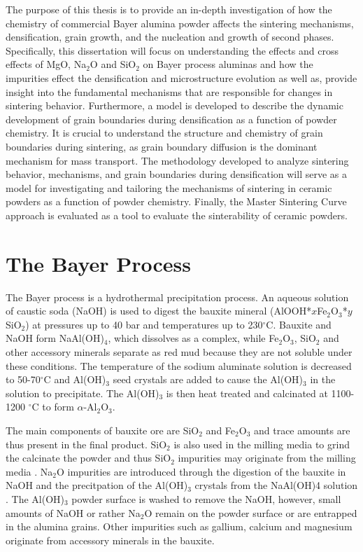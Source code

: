 The purpose of this thesis is to provide an in-depth investigation of how the chemistry of commercial Bayer alumina powder affects the sintering mechanisms, densification, grain growth, and the nucleation and growth of second phases. Specifically, this dissertation will focus on understanding the effects and cross effects of MgO, Na$_{2}$O and SiO$_{2}$ on Bayer process aluminas and how the impurities effect the densification and microstructure evolution as well as, provide insight into the fundamental mechanisms that are responsible for changes in sintering behavior. Furthermore, a model is developed to describe the dynamic development of grain boundaries during densification as a function of powder chemistry. It is crucial to understand the structure and chemistry of grain boundaries during sintering, as grain boundary diffusion is the dominant mechanism for mass transport. The methodology developed to analyze sintering behavior, mechanisms, and grain boundaries during densification will serve as a model for investigating and tailoring the mechanisms of sintering in ceramic powders as a function of powder chemistry. Finally, the Master Sintering Curve approach is evaluated as a tool to evaluate the sinterability of ceramic powders.


\section{The Bayer Process}

The Bayer process is a hydrothermal precipitation process. An aqueous solution of caustic soda (NaOH) is used to digest the bauxite mineral (AlOOH*$x$Fe$_{2}$O$_{3}$*$y$SiO$_{2}$) at pressures up to 40 bar and temperatures up to 230$^{\circ}$C. Bauxite and NaOH form NaAl(OH)$_{4}$, which dissolves as a complex, while Fe$_{2}$O$_{3}$, SiO$_{2}$ and other accessory minerals separate as red mud because they are not soluble under these conditions. The temperature of the sodium aluminate solution is decreased to 50-70$^{\circ}$C and Al(OH)$_{3}$ seed crystals are added to cause the Al(OH)$_{3}$ in the solution to precipitate. The Al(OH)$_{3}$ is then heat treated and calcinated at 1100-1200 $^{\circ}$C to form $\alpha$-Al$_{2}$O$_{3}$.

The main components of bauxite ore are SiO$_{2}$ and Fe$_{2}$O$_{3}$ and trace amounts are thus present in the final product. SiO$_{2}$ is also used in the milling media to grind the calcinate the powder and thus SiO$_{2}$ impurities may originate from the milling media \cite{Compson2013}. Na$_{2}$O impurities are introduced through the digestion of the bauxite in NaOH and the precitpation of the Al(OH)$_{3}$ crystals from the NaAl(OH)4 solution \cite{Compson2013}. The Al(OH)$_{3}$ powder surface is washed to remove the NaOH, however, small amounts of NaOH or rather Na$_{2}$O remain on the powder surface or are entrapped in the alumina grains. Other impurities such as gallium, calcium and magnesium originate from accessory minerals in the bauxite.

